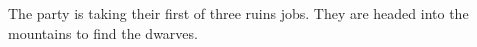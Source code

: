 The party is taking their first of three ruins jobs.
They are headed into the mountains to find the dwarves.
